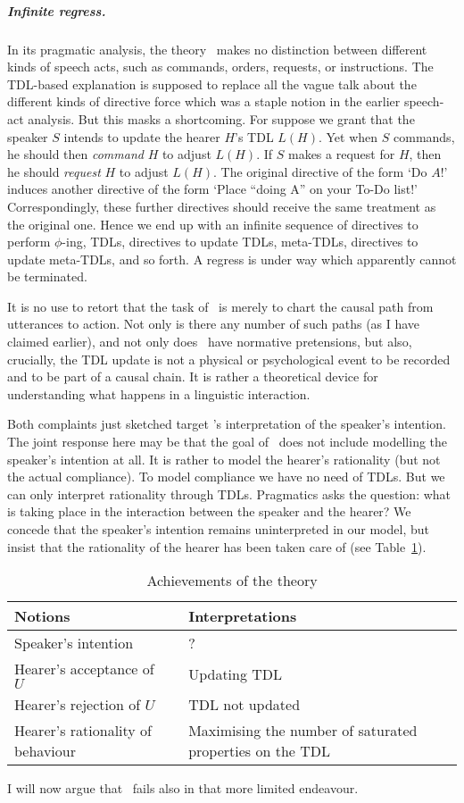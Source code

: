   
\subparagraph{Infinite regress.}
In its pragmatic analysis, the theory \Th\ makes no distinction between different kinds of speech acts, such as commands, orders, requests, or instructions. The TDL-based explanation is supposed to replace all the vague talk about the different kinds of directive force which was a staple notion in the earlier speech-act analysis. But this masks a shortcoming. For suppose we grant that the speaker $S$ intends to update the hearer $H$'s TDL $L(H)$. Yet when $S$ commands, he should then \emph{command} $H$ to adjust $L(H)$. If $S$ makes a request for $H$, then he should \emph{request} $H$ to adjust $L(H)$. The original directive of the form `Do $A$!' induces another directive of the form `Place ``doing A'' on your To-Do list!' Correspondingly, these further directives should receive the same treatment as the original one. Hence we end up with an infinite sequence of directives to perform $\phi$-ing, TDLs, directives to update TDLs, meta-TDLs, directives to update meta-TDLs, and so forth. A regress is under way which apparently cannot be terminated.

It is no use to retort that the task of \Th\ is merely to chart the causal path from utterances to action. Not only is there any number of such paths (as I have claimed earlier), and not only does \Th\ have normative pretensions, but also, crucially, the TDL update is not a physical or psychological event to be recorded and to be part of a causal chain. It is rather a theoretical device for understanding what happens in a linguistic interaction.

Both complaints just sketched target \Th's interpretation of the speaker's intention. The joint response here may be that the goal of \Th\ does not include modelling the speaker's intention at all. It is rather to model the hearer's rationality (but not the actual compliance). To model compliance we have no need of TDLs. But we can only interpret rationality through TDLs. Pragmatics asks the question: what is taking place in the interaction between the speaker and the hearer? We concede that the speaker's intention remains uninterpreted in our model, but insist that the rationality of the hearer has been taken care of (see Table~\ref{tab:1}).
    \begin{table}[!h]
\centering
      \begin{tabular}{@{}ll  p{75mm}@{}}
 \toprule     
 Notions && Interpretations\\ %
 \midrule
 Speaker's intention && ? \\ 
 Hearer's acceptance of $U$ && Updating TDL \\
 Hearer's rejection of $U$ && TDL not updated \\
 Hearer's rationality of behaviour && Maximising the number of saturated properties on the TDL \\
 \bottomrule
 \end{tabular}
      \caption{Achievements of the theory \Th}
      \label{tab:1}
    \end{table}
I will now argue that \Th\ fails also in that more limited endeavour.

